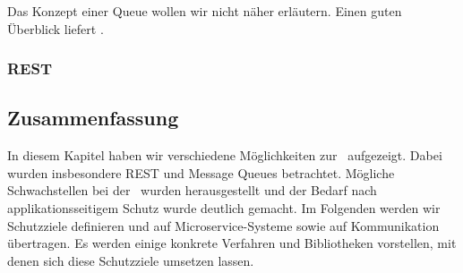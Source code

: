 Das Konzept einer Queue wollen wir nicht näher erläutern. Einen guten Überblick liefert \cite{hohpe2003}.



\subsubsection{REST}

\subsection{Zusammenfassung}

In diesem Kapitel haben wir verschiedene Möglichkeiten zur \stscom\ aufgezeigt. Dabei wurden insbesondere REST und Message Queues betrachtet. Mögliche Schwachstellen bei der \stscom\ wurden herausgestellt und der Bedarf nach applikationsseitigem Schutz wurde deutlich gemacht. Im Folgenden werden wir Schutzziele definieren und auf Microservice-Systeme sowie auf Kommunikation übertragen. Es werden einige konkrete Verfahren und Bibliotheken vorstellen, mit denen sich diese Schutzziele umsetzen lassen. 